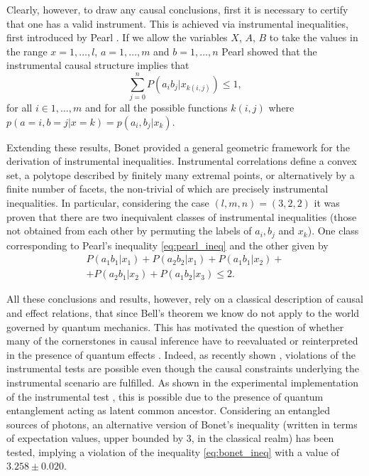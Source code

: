 \documentclass[letterpaper]{article}
\begin{document}
Clearly, however, to draw any causal conclusions, first it is necessary to
certify that one has a valid instrument. This is achieved via instrumental
inequalities, first introduced by Pearl \cite{}. If we allow the variables $X$,
$A$, $B$ to take the values in the range  $x=1,\dots,l$, $a=1,\dots,m$ and
$b=1,\dots,n$ Pearl showed that the instrumental causal structure implies that 
\begin{equation} 
    \sum_{j=0}^{n} P(a_i b_j|x_{k(i,j)}) \le 1,
    \label{eq:pearl_ineq}
\end{equation}
for all $i \in {1,\ldots, m}$ and for all the possible functions $k(i,j)$ where $p(a=i,b=j\vert x=k)=p(a_i,b_j|x_k)$.

Extending these results, Bonet \cite{bonet2001} provided a 
general geometric framework for the derivation of instrumental inequalities.
Instrumental correlations define a convex set, a polytope described by finitely
many extremal points, or alternatively by a finite number of facets, the
non-trivial of which are precisely instrumental inequalities. In particular,
considering the case $(l,m,n) = (3,2,2)$ it was proven that there are two
inequivalent classes of instrumental inequalities (those not obtained from each
other by permuting the labels of $a_i,b_j$ and $x_k$). One class corresponding
to Pearl's inequality \eqref{eq:pearl_ineq} and the other given by
\begin{multline}
    P(a_1 b_1 | x_1) + P(a_2 b_2 | x_1) + 
    P(a_1 b_1 | x_2) +\\+ P(a_2 b_1 | x_2) + 
    P(a_1 b_2 | x_3) \le 2.
    \label{eq:bonet_ineq}
\end{multline}

All these conclusions and results, however, rely on a classical description of
causal and effect relations, that since Bell's theorem \cite{} we know do not
apply to the world governed by quantum mechanics. This has motivated the
question of whether many of the cornerstones in causal inference have to
reevaluated or reinterpreted in the presence of quantum effects \cite{}. Indeed,
as recently shown \cite{chaves2018}, violations of the instrumental tests are
possible even though the causal constraints underlying the instrumental scenario
are fulfilled. As shown in the experimental implementation of the instrumental
test \cite{}, this is possible due to the presence of quantum entanglement
acting as latent common ancestor. Considering an entangled sources of photons,
an alternative version of Bonet's inequality (written in terms of expectation
values, upper bounded by 3, in the classical realm) has been tested, implying a
violation of the inequality \eqref{eq:bonet_ineq} with a 
value of $3.258 \pm 0.020$. 
\end{document}
